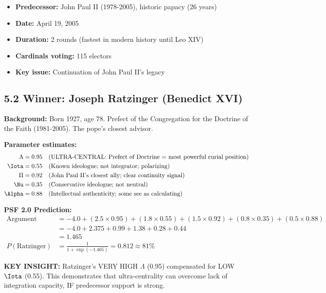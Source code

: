 \documentclass[11pt]{article}
\begin{document}
\begin{itemize}
\item \textbf{Predecessor:} John Paul II (1978-2005), historic papacy (26 years)
\item \textbf{Date:} April 19, 2005
\item \textbf{Duration:} 2 rounds (fastest in modern history until Leo XIV)
\item \textbf{Cardinals voting:} 115 electors
\item \textbf{Key issue:} Continuation of John Paul II's legacy
\end{itemize}

\subsection{5.2 Winner: Joseph Ratzinger (Benedict XVI)}

\textbf{Background:} Born 1927, age 78. Prefect of the Congregation for the Doctrine of the Faith (1981-2005). The pope's closest advisor.

\textbf{Parameter estimates:}
\begin{align*}
\Lambda &= 0.95 \quad \text{(ULTRA-CENTRAL: Prefect of Doctrine = most powerful curial position)} \\
\Iota &= 0.55 \quad \text{(Known ideologue; not integrator; polarizing)} \\
\Pi &= 0.92 \quad \text{(John Paul II's closest ally; clear continuity signal)} \\
\Nu &= 0.35 \quad \text{(Conservative ideologue; not neutral)} \\
\Alpha &= 0.88 \quad \text{(Intellectual authenticity; some see as calculating)}
\end{align*}

\textbf{PSF 2.0 Prediction:}
\begin{align*}
\text{Argument} &= -4.0 + (2.5 \times 0.95) + (1.8 \times 0.55) + (1.5 \times 0.92) + (0.8 \times 0.35) + (0.5 \times 0.88) \\
&= -4.0 + 2.375 + 0.99 + 1.38 + 0.28 + 0.44 \\
&= 1.465 \\
P(\text{Ratzinger}) &= \frac{1}{1 + \exp(-1.465)} = 0.812 \approx 81\%
\end{align*}

\textbf{KEY INSIGHT:} Ratzinger's VERY HIGH $\Lambda$ (0.95) compensated for LOW $\Iota$ (0.55). This demonstrates that ultra-centrality can overcome lack of integration capacity, IF predecessor support is strong.
\end{document}
